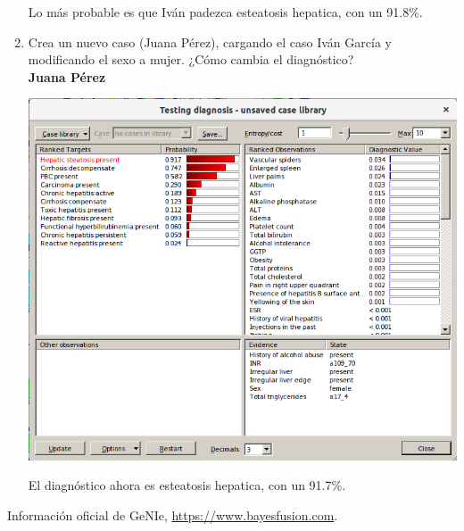 \documentclass{article}
\begin{document}
\begin{enumerate}[label=\alph*)]
Lo más probable es que Iván padezca esteatosis hepatica, con un 91.8\%.

\item Crea un nuevo caso (Juana Pérez), cargando el caso Iván García y modificando el sexo a mujer. ¿Cómo cambia el diagnóstico?\\
\newpage
\textbf{Juana Pérez}
\begin{flushleft}
\includegraphics[scale=0.4]{Juana.png}
\end{flushleft}

El diagnóstico ahora es esteatosis hepatica, con un 91.7\%.

\end{enumerate}

\begin{thebibliography}{9}
 Información oficial de GeNIe, \url{https://www.bayesfusion.com}.
\end{thebibliography}
\end{document}
